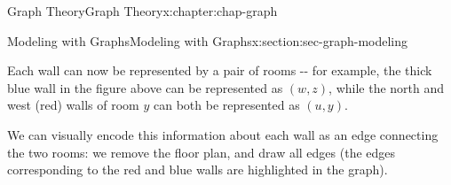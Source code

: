 \documentclass[oneside,10pt,]{book}
\numberwithin{equation}{section}
\begin{document}
\begin{chapterptx}{Graph Theory}{}{Graph Theory}{}{}{x:chapter:chap-graph}
\begin{sectionptx}{Modeling with Graphs}{}{Modeling with Graphs}{}{}{x:section:sec-graph-modeling}
\begin{sidebyside}{1}{0.325}{0.325}{0}
\begin{sbspanel}{0.35}
{}%
\end{sbspanel}%
\end{sidebyside}%
\par
Each wall can now be represented by a pair of rooms -{}-{} for example, the thick blue wall in the figure above can be represented as \((w,z)\), while the north and west (red) walls of room \(y\) can both be represented as \((u,y)\).%
\par
We can visually encode this information about each wall as an edge connecting the two rooms: we remove the floor plan, and draw all edges (the edges corresponding to the red and blue walls are highlighted in the graph).%
\begin{sidebyside}{1}{0.325}{0.325}{0}%
\begin{sbspanel}{0.35}%
\end{sbspanel}
\end{sidebyside}
\end{sectionptx}
\end{chapterptx}
\end{document}
